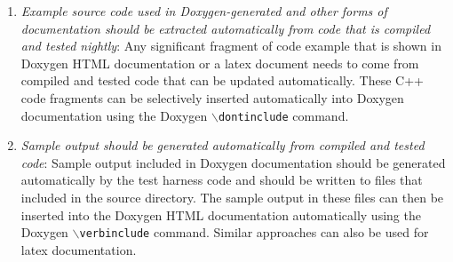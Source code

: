 \begin{enumerate}
{\begin{verbatim}
    /** \name Overriden from Teuchos::ParameterListAccpetor */
    //@{

    /** \brief . */
    void setParameterList(
      Teuchos::RefCountPtr<Teuchos::ParameterList> const& paramList);
    /** \brief . */
    Teuchos::RefCountPtr<Teuchos::ParameterList> getParameterList();
    /** \brief . */
    Teuchos::RefCountPtr<Teuchos::ParameterList> unsetParameterList();
    /** \brief . */
    Teuchos::RefCountPtr<const Teuchos::ParameterList> getParameterList() const;
    /** \brief . */
    Teuchos::RefCountPtr<const Teuchos::ParameterList> getValidParameters() const;

    //@}

    ...

  };

\end{verbatim}}

{}\item\textit{Example source code used in Doxygen-generated and other forms
of documentation should be extracted automatically from code that is compiled
and tested nightly}: Any significant fragment of code example that is shown in
Doxygen HTML documentation or a latex document needs to come from compiled and
tested code that can be updated automatically.  These C++ code fragments can
be selectively inserted automatically into Doxygen documentation using the
Doxygen {}\texttt{$\backslash$dontinclude} command.

{}\item\textit{Sample output should be generated automatically from compiled
and tested code}: Sample output included in Doxygen documentation should be
generated automatically by the test harness code and should be written to
files that included in the source directory.  The sample output in these files
can then be inserted into the Doxygen HTML documentation automatically using
the Doxygen {}\texttt{$\backslash$verbinclude} command.  Similar approaches
can also be used for latex documentation.

\end{enumerate}
